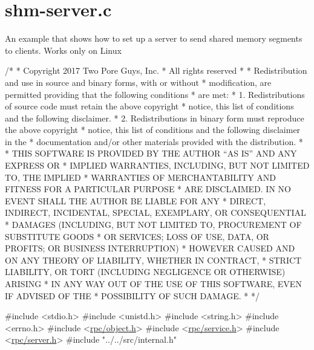 \hypertarget{shm-server_8c-example}{}\section{shm-\/server.\+c}
An example that shows how to set up a server to send shared memory segments to clients. Works only on Linux


\begin{DoxyCodeInclude}
\textcolor{comment}{/*}
\textcolor{comment}{ * Copyright 2017 Two Pore Guys, Inc.}
\textcolor{comment}{ * All rights reserved}
\textcolor{comment}{ *}
\textcolor{comment}{ * Redistribution and use in source and binary forms, with or without}
\textcolor{comment}{ * modification, are permitted providing that the following conditions}
\textcolor{comment}{ * are met:}
\textcolor{comment}{ * 1. Redistributions of source code must retain the above copyright}
\textcolor{comment}{ *    notice, this list of conditions and the following disclaimer.}
\textcolor{comment}{ * 2. Redistributions in binary form must reproduce the above copyright}
\textcolor{comment}{ *    notice, this list of conditions and the following disclaimer in the}
\textcolor{comment}{ *    documentation and/or other materials provided with the distribution.}
\textcolor{comment}{ *}
\textcolor{comment}{ * THIS SOFTWARE IS PROVIDED BY THE AUTHOR ``AS IS'' AND ANY EXPRESS OR}
\textcolor{comment}{ * IMPLIED WARRANTIES, INCLUDING, BUT NOT LIMITED TO, THE IMPLIED}
\textcolor{comment}{ * WARRANTIES OF MERCHANTABILITY AND FITNESS FOR A PARTICULAR PURPOSE}
\textcolor{comment}{ * ARE DISCLAIMED.  IN NO EVENT SHALL THE AUTHOR BE LIABLE FOR ANY}
\textcolor{comment}{ * DIRECT, INDIRECT, INCIDENTAL, SPECIAL, EXEMPLARY, OR CONSEQUENTIAL}
\textcolor{comment}{ * DAMAGES (INCLUDING, BUT NOT LIMITED TO, PROCUREMENT OF SUBSTITUTE GOODS}
\textcolor{comment}{ * OR SERVICES; LOSS OF USE, DATA, OR PROFITS; OR BUSINESS INTERRUPTION)}
\textcolor{comment}{ * HOWEVER CAUSED AND ON ANY THEORY OF LIABILITY, WHETHER IN CONTRACT,}
\textcolor{comment}{ * STRICT LIABILITY, OR TORT (INCLUDING NEGLIGENCE OR OTHERWISE) ARISING}
\textcolor{comment}{ * IN ANY WAY OUT OF THE USE OF THIS SOFTWARE, EVEN IF ADVISED OF THE}
\textcolor{comment}{ * POSSIBILITY OF SUCH DAMAGE.}
\textcolor{comment}{ *}
\textcolor{comment}{ */}

\textcolor{preprocessor}{#include <stdio.h>}
\textcolor{preprocessor}{#include <unistd.h>}
\textcolor{preprocessor}{#include <string.h>}
\textcolor{preprocessor}{#include <errno.h>}
\textcolor{preprocessor}{#include <\hyperlink{object_8h}{rpc/object.h}>}
\textcolor{preprocessor}{#include <\hyperlink{service_8h}{rpc/service.h}>}
\textcolor{preprocessor}{#include <\hyperlink{server_8h}{rpc/server.h}>}
\textcolor{preprocessor}{#include "../../src/internal.h"}


\end{DoxyCodeInclude}

